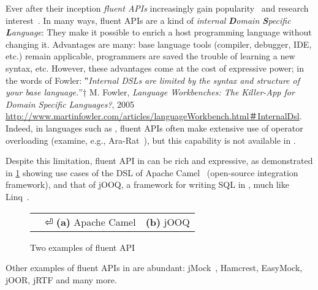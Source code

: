 Ever after their inception \emph{fluent APIs}
  increasingly gain popularity~\cite{Bauer:2005,Freeman:Pryce:06,Larsen:2012} and research
  interest~\cite{Deursen:2000,Kabanov:2008}.
In many ways, fluent APIs are a kind of
  \emph{internal} \emph{\textbf Domain \textbf Specific \textbf Language}:
They make it possible to enrich a host programming language without changing it.
Advantages are many: base language tools (compiler, debugger, IDE, etc.) remain
  applicable, programmers are saved the trouble of learning a new syntax, etc.
However, these advantages come at the cost of expressive power;
  in the words of Fowler:
  ‟\emph{Internal DSLs are limited by the syntax and structure of your base language.}”†
  {M. Fowler, \emph{Language Workbenches: The Killer-App for Domain Specific Languages?},
    2005
    \newline
  \url{http://www.martinfowler.com/articles/languageWorkbench.html＃InternalDsl}}.
Indeed, in languages such as \CC, fluent APIs
  often make extensive use of operator overloading (examine, e.g., \textsf{Ara-Rat}~\cite{Gil:Lenz:07}),
  but this capability is not available in \Java.

Despite this limitation, fluent API in \Java can be rich and expressive, as demonstrated
  in \cref{Figure:DSL} showing use cases of the DSL of Apache Camel~\cite{Ibsen:Anstey:10}
(open-source integration framework),
and that of jOOQ, a framework for writing
  SQL in \Java, much like Linq~\cite{Meijer:Beckman:Bierman:06}.

\begin{figure}[H]
  \caption{\label{Figure:DSL} Two examples of \Java fluent API}
  \begin{tabular}{@{}c@{}c@{}}
    \parbox[c]{44ex}{} &
    \hspace{-3ex} \parbox[c]{59ex}{}⏎
    \textbf{(a)} Apache Camel & \textbf{(b)} jOOQ
  \end{tabular}
\end{figure}

Other examples of fluent APIs in \Java are abundant:
  jMock~\cite{Freeman:Pryce:06},
  Hamcrest,
  EasyMock,
  jOOR,
  jRTF
  and many more.

